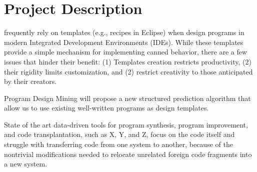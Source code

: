 \chapter{Project Description}{}
\label{sec:related}

 frequently rely on templates (e.g., 
recipes in Eclipse) when design programs in modern Integrated 
Development Environments (IDEs). While these templates provide 
a simple mechanism for implementing canned behavior, there are a 
few issues that hinder their benefit: (1) Templates creation 
restricts productivity, (2) their rigidity limits customization, 
and (2) restrict creativity to those anticipated by their creators.

Program Design Mining will propose a new structured prediction 
algorithm that allow us to use existing well-written programs 
as design templates.    

State of the art data-driven tools for program synthesis, program 
improvement, and code transplantation, such as X, Y, and Z, focus 
on the code itself and struggle with transferring code from one system 
to another, because of the nontrivial modifications needed to relocate 
unrelated foreign code fragments into a new system. 